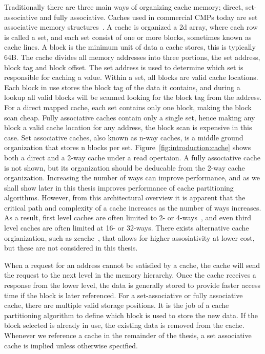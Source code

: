 Traditionally there are three main ways of organizing cache memory; direct, set-associative and fully associative.
Caches used in commercial CMPs today are set associative memory structures~\cite{Thomadakis2011, Jain2013}.
A cache is organized a 2d array, where each row is called a set, and each set consist of one or more blocks, sometimes known as cache lines.
A block is the minimum unit of data a cache stores, this is typically 64B.
The cache divides all memory addresses into three portions, the set address, block tag and block offset.
The set address is used to determine which set is responsible for caching a value.
Within a set, all blocks are valid cache locations.
Each block in use stores the block tag of the data it contains, and during a lookup all valid blocks will be scanned looking for  the block tag from the address.
For a direct mapped cache, each set contains only one block, making the block scan cheap.
Fully associative caches contain only a single set, hence making any block a valid cache location for any address, the block scan is expensive in this case.
Set associative caches, also known as n-way caches, is a middle ground organization that stores n blocks per set.
Figure~\ref{fig:introduction:cache} shows both a direct and a 2-way cache under a read opertaion.
A fully associative cache is not shown, but its organization should be deducable from the 2-way cache organization.
Increasing the number of ways can improve performance, and as we shall show later in this thesis improves performance of cache partitioning algorithms.
However, from this architectural overview it is apparent that the critical path and complexity of a cache increases as the number of ways increases.
As a result, first level caches are often limited to 2- or 4-ways~\cite{Sachez2010}, and even third level caches are often limited at 16- or 32-ways.
There exists alternative cache orgianization, such as zcache~\cite{Sanchez2010}, that allows for higher assosiativity at lower cost, but these are not considered in this thesis.

When a request for an address cannot be satisfied by a cache, the cache will send the request to the next level in the memory hierarchy.
Once the cache receives a response from the lower level, the data is generally stored to provide faster access time if the block is later referenced.
For a set-associative or fully associative cache, there are multiple valid storage positions.
It is the job of a cache partitioning algorithm to define which block is used to store the new data.
If the block selected is already in use, the existing data is removed from the cache.
Whenever we reference a cache in the remainder of the thesis, a set associative cache is implied unless otherwise specified.

